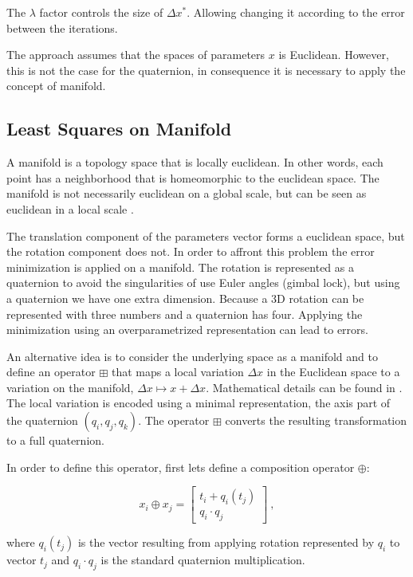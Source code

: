 \noindent The $\lambda$ factor controls the size of $ \Delta x^*$. Allowing changing it according to the error between the iterations.
 
The approach assumes that the spaces of parameters $x$ is Euclidean. However, this is not the case for the quaternion, 
in consequence it is necessary to apply the concept of manifold.


\subsection{Least Squares on Manifold}

A manifold is a topology space that is locally euclidean. In other words, each point has a neighborhood that is 
homeomorphic to the euclidean space. The manifold is not necessarily euclidean on a global scale, but can be seen 
as euclidean in a local scale \cite{manifold}.

The translation component of the parameters vector forms a euclidean space, but the rotation component does not.
In order to affront this problem the error minimization is applied on a manifold. The rotation is represented as a 
quaternion to avoid the singularities of use Euler angles (gimbal lock), but using a quaternion we have one extra 
dimension. Because a 3D rotation can be represented with three numbers and a quaternion has four. Applying the 
minimization using an overparametrized representation can lead to errors.

An alternative idea is to consider the underlying space as a manifold
and to define an operator $\boxplus$ that maps a local variation
$\Delta x$ in the Euclidean space to a variation on the manifold, $\Delta x \mapsto x + \Delta x$. 
Mathematical details can be found in \cite{hertzberg08}. The local variation is encoded using a minimal 
representation, the axis part of the quaternion $(q_i,q_j,q_k)$. The operator $\boxplus$ converts the 
resulting transformation to a full quaternion.

In order to define this operator, first lets define a composition operator $\oplus$:

$$
x_i \oplus x_j = \begin{bmatrix} t_i + q_i(t_j) \\ q_i \cdot q_j \end{bmatrix} \ ,
$$

\noindent where $q_i(t_j)$ is the vector resulting from applying rotation represented by $q_i$ to vector $t_j$ and 
$q_i \cdot q_j$ is the standard quaternion multiplication.

